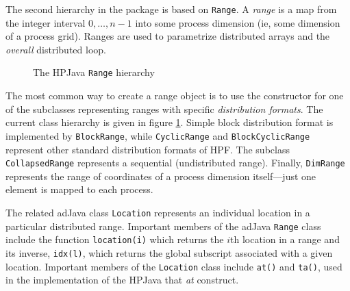 The second hierarchy in the package is based on \texttt{Range}.
A {\em range} is a map from the integer interval $0,\ldots,n-1$ into
some process dimension (ie, some dimension of a process grid).
Ranges are used to parametrize distributed arrays and the
{\em overall} distributed loop.
\begin{figure}[htb]
  \begin{center}
    \leavevmode
    \caption{The HPJava {\tt Range} hierarchy}
    \label{fig:ranges}
  \end{center}
\end{figure}
The most common way to create a range object is to use the constructor
for one of the subclasses representing ranges with specific {\em
distribution formats}.  The current class hierarchy is given in figure
\ref{fig:ranges}.  Simple block distribution format is implemented by
{\tt BlockRange}, while \texttt{CyclicRange} and \texttt{BlockCyclicRange}
represent other standard distribution formats of HPF.  The subclass
\texttt{CollapsedRange} represents a sequential (undistributed range).
Finally, \texttt{DimRange} represents the range of coordinates of a
process dimension itself---just one element is mapped to each process.

The related adJava class \texttt{Location} represents an individual
location in a particular distributed range.  Important members of the
adJava {\tt Range} class include the function {\tt location(i)} which
returns the $i$th location in a range and its inverse, {\tt idx(l)},
which returns the global subscript associated with a given location.
Important members of the {\tt Location} class include {\tt at()} and
{\tt ta()}, used in the implementation of the HPJava that {\em at}
construct.

